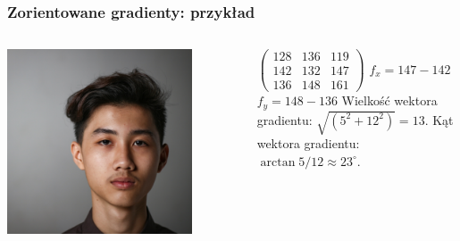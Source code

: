 \documentclass{beamer}
\begin{document}
            \begin{frame}
                \frametitle{Zorientowane gradienty: przykład}
                \begin{columns}
                    \begin{column}{0.5\textwidth}
                        \begin{center}
                            \includegraphics[width=0.8\textwidth]{pictures/face_unsplash}
                        \end{center}
                    \end{column}
                    \begin{column}{0.5\textwidth}
                            $\begin{pmatrix}
                                128 & 136 & 119\\
                                142 & 132 & 147\\
                                136 & 148 & 161
                            \end{pmatrix}$
                            \newline
                            \newline
                            \newline
                            $f_{x}=147-142$
                            \newline
                            $f_{y}=148-136$
                            \newline
                            \newline
                            Wielkość wektora gradientu: $\sqrt{\left( 5^{2}+12^{2}\right)} = 13$.
                            \newline
                            \newline
                            Kąt wektora gradientu: $\arctan{5/12} \approx 23^\circ$.
                    \end{column}
                \end{columns}
            \end{frame}
\end{document}
